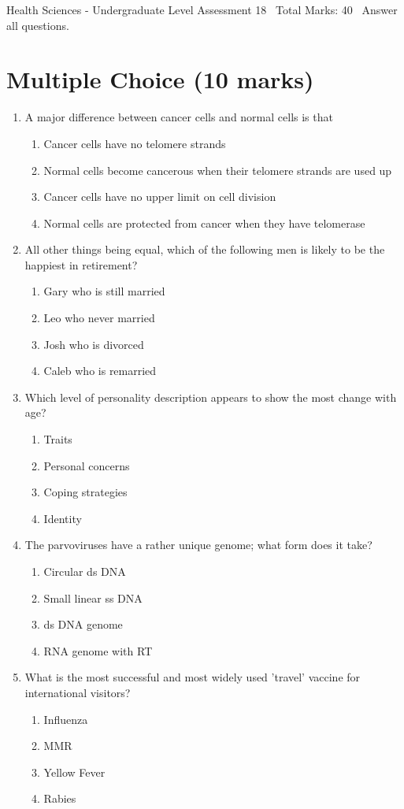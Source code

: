 \documentclass[12pt]{article}
\begin{document}
\begin{center}
Health Sciences - Undergraduate Level Assessment 18 \
Total Marks: 40 \
Answer all questions.
\end{center}

\section*{Multiple Choice (10 marks)}
\begin{enumerate}[label=\arabic*.]
\item A major difference between cancer cells and normal cells is that
\begin{enumerate}[label=(\alph*)]
    \item Cancer cells have no telomere strands
    \item Normal cells become cancerous when their telomere strands are used up
    \item Cancer cells have no upper limit on cell division
    \item Normal cells are protected from cancer when they have telomerase
\end{enumerate}
\item All other things being equal, which of the following men is likely to be the happiest in retirement?
\begin{enumerate}[label=(\alph*)]
    \item Gary who is still married
    \item Leo who never married
    \item Josh who is divorced
    \item Caleb who is remarried
\end{enumerate}
\item Which level of personality description appears to show the most change with age?
\begin{enumerate}[label=(\alph*)]
    \item Traits
    \item Personal concerns
    \item Coping strategies
    \item Identity
\end{enumerate}
\item The parvoviruses have a rather unique genome; what form does it take?
\begin{enumerate}[label=(\alph*)]
    \item Circular ds DNA
    \item Small linear ss DNA
    \item ds DNA genome
    \item RNA genome with RT
\end{enumerate}
\item What is the most successful and most widely used 'travel' vaccine for international visitors?
\begin{enumerate}[label=(\alph*)]
    \item Influenza
    \item MMR
    \item Yellow Fever
    \item Rabies
\end{enumerate}
\end{enumerate}
\end{document}
